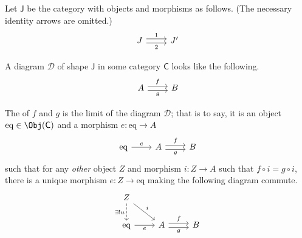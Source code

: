 \documentclass[main.tex]{subfiles}
\begin{document}
\begin{definition}[equalizer]
  \label{def:equalizer}
  Let $\mathsf{J}$ be the category with objects and morphisms as follows. (The necessary identity arrows are omitted.)
  \begin{equation*}
    \begin{tikzcd}
      J
      \arrow[r, shift left, "1"]
      \arrow[r, shift right, swap, "2"]
      & J'
    \end{tikzcd}
  \end{equation*}

  A diagram $\mathcal{D}$ of shape $\mathsf{J}$ in some category $\mathsf{C}$ looks like the following.
  \begin{equation*}
    \begin{tikzcd}
      A
      \arrow[r, shift left, "f"]
      \arrow[r, shift right, swap, "g"]
      & B
    \end{tikzcd}
  \end{equation*}

  The  of $f$ and $g$ is the limit of the diagram $\mathcal{D}$; that is to say, it is an object $\mathrm{eq} \in \Obj(\mathsf{C})$ and a morphism $e\colon \mathrm{eq} \to A$
  \begin{equation*}
    \begin{tikzcd}
      \mathrm{eq}
      \arrow[r, "e"]
      & A
      \arrow[r, shift left, "f"]
      \arrow[r, shift right, swap, "g"]
      & B
    \end{tikzcd}
  \end{equation*}
  such that for any \emph{other} object $Z$ and morphism $i\colon Z \to A$ such that $f \circ i = g \circ i$, there is a unique morphism $e\colon Z \to \mathrm{eq}$ making the following diagram commute.
  \begin{equation*}
    \begin{tikzcd}
      Z
      \arrow[d, swap, dashed, "\exists! u"]
      \arrow[dr, "i"]
      \\
      \mathrm{eq}
      \arrow[r, swap, "e"]
      & A
      \arrow[r, shift left, "f"]
      \arrow[r, shift right, swap, "g"]
      & B
    \end{tikzcd}
  \end{equation*}
\end{definition}
\end{document}
